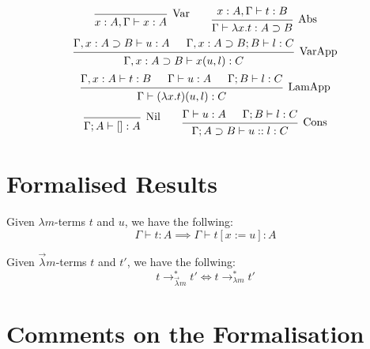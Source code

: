 \begin{definition}
  \[
    \begin{prooftree}
      \infer0[Var]{ x:A, \Gamma \vdash x:A } 
    \end{prooftree}
    \qquad
    \begin{prooftree}
      \hypo{ x:A, \Gamma \vdash t:B }
      \infer1[Abs]{ \Gamma \vdash \lambda x . t : A \supset B  } 
    \end{prooftree}
  \]
  \[
    \begin{prooftree}
      \hypo{ \Gamma, x:A \supset B \vdash u:A}
      \hypo{ \Gamma, x:A \supset B ; B \vdash l:C }	
      \infer2[VarApp]{ \Gamma, x:A \supset B \vdash x(u, l) : C } 
    \end{prooftree}
  \]
  \[
    \begin{prooftree}
      \hypo{ \Gamma, x:A \vdash t:B }
      \hypo{ \Gamma \vdash u:A }
      \hypo{ \Gamma ; B \vdash l : C }	
      \infer3[LamApp]{ \Gamma \vdash (\lambda x . t)(u, l) : C } 
    \end{prooftree}
  \]
  \[
    \begin{prooftree}
      \infer0[Nil]{ \Gamma ; A \vdash []:A } 
    \end{prooftree}
    \qquad
    \begin{prooftree}
      \hypo{ \Gamma \vdash u:A }
      \hypo{ \Gamma ; B \vdash l:C }
      \infer2[Cons]{ \Gamma ; A \supset B \vdash  u::l : C } 
    \end{prooftree}
  \]
\end{definition}

\section{Formalised Results}

\begin{theorem}
  Given $\lambda m$-terms $t$ and $u$, we have the follwing:
  \[
    \Gamma \vdash t : A \implies \Gamma \vdash t[x := u] : A
  \]
\end{theorem}

\begin{theorem}[Conservativeness]
  Given $\vec \lambda m$-terms $t$ and $t'$, we have the follwing:
  \[
    t \to^{*}_{\vec \lambda m} t' \Longleftrightarrow
    t \to^{*}_{\lambda m} t'
  \]
\end{theorem}

\section{Comments on the Formalisation}

